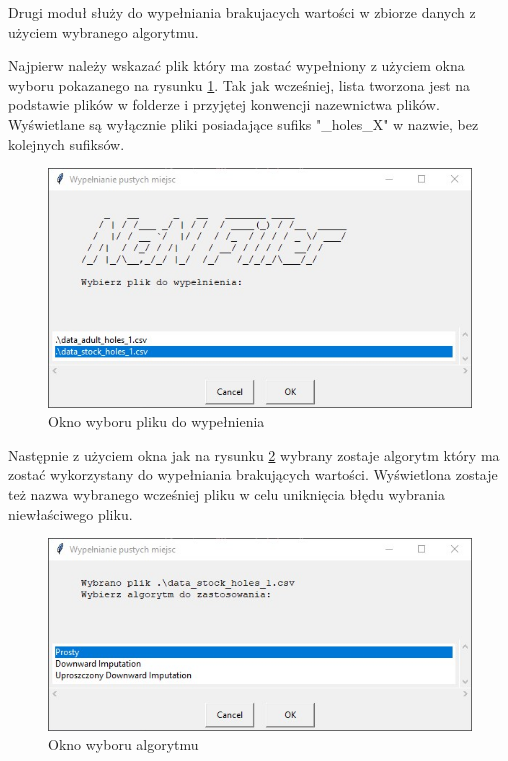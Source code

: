 \documentclass[12pt,twoside]{article}
\begin{document}

Drugi moduł służy do wypełniania brakujacych wartości w zbiorze danych z użyciem wybranego algorytmu. 

Najpierw należy wskazać plik który ma zostać wypełniony z użyciem okna wyboru pokazanego na rysunku \ref{Fig:fill_file}.
Tak jak wcześniej, lista tworzona jest na podstawie plików w folderze i przyjętej konwencji nazewnictwa plików.
Wyświetlane są wyłącznie pliki posiadające sufiks "\_holes\_X" w nazwie, bez kolejnych sufiksów.

\begin{figure}[ht]
	\centering
	\includegraphics[width=12cm]{img/05.jpg}
	\caption{Okno wyboru pliku do wypełnienia}
\label{Fig:fill_file}
\end{figure}
\FloatBarrier

Następnie z użyciem okna jak na rysunku \ref{Fig:fill_alg}
wybrany zostaje algorytm który ma zostać wykorzystany do wypełniania brakujących wartości.
Wyświetlona zostaje też nazwa wybranego wcześniej pliku w celu uniknięcia błędu wybrania niewłaściwego pliku.

\begin{figure}[ht]
	\centering
	\includegraphics[width=12cm]{img/06.jpg}
	\caption{Okno wyboru algorytmu}
\label{Fig:fill_alg}
\end{figure}
\FloatBarrier
\end{document}
